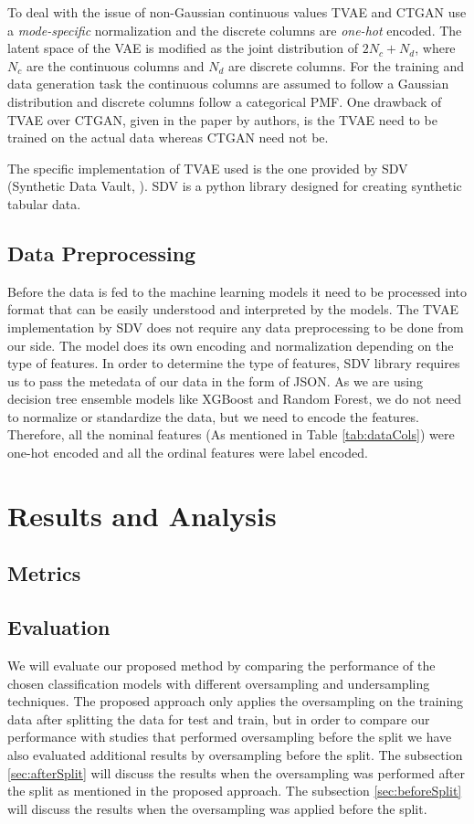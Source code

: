 \documentclass[twoside,11pt]{article}
\begin{document}
\begin{keywords}
To deal with the issue of non-Gaussian continuous values TVAE and CTGAN use a \emph{mode-specific} normalization and the discrete columns are \emph{one-hot} encoded. The latent space of the VAE is modified as the joint distribution of \(2N_c + N_d\), where \(N_c\) are the continuous columns and \(N_d\) are discrete columns. For the training and data generation task the continuous columns are assumed to follow a Gaussian distribution and discrete columns follow a categorical PMF. One drawback of TVAE over CTGAN, given in the paper by authors, is the TVAE need to be trained on the actual data whereas CTGAN need not be. 

The specific implementation of TVAE used is the one provided by SDV (Synthetic Data Vault, \citealp{SDV}). SDV is a python library designed for creating synthetic tabular data.

\subsection{Data Preprocessing}
Before the data is fed to the machine learning models it need to be processed into format that can be easily understood and interpreted by the models. The TVAE implementation by SDV does not require any data preprocessing to be done from our side. The model does its own encoding and normalization depending on the type of features. In order to determine the type of features, SDV library requires us to pass the metedata of our data in the form of JSON. As we are using decision tree ensemble models like XGBoost and Random Forest, we do not need to normalize or standardize the data, but we need to encode the features. Therefore, all the nominal features (As mentioned in Table \ref{tab:dataCols}) were one-hot encoded and all the ordinal features were label encoded.

\section{Results and Analysis}  \label{sec:result}
\subsection{Metrics}

\subsection{Evaluation}
We will evaluate our proposed method by comparing the performance of the chosen classification models with different oversampling and undersampling techniques. The proposed approach only applies the oversampling on the training data after splitting the data for test and train, but in order to compare our performance with studies that performed oversampling before the split we have also evaluated additional results by oversampling before the split. The subsection \ref{sec:afterSplit} will discuss the results when the oversampling was performed after the split as mentioned in the proposed approach. The subsection \ref{sec:beforeSplit} will discuss the results when the oversampling was applied before the split.


\end{keywords}
\end{document}
